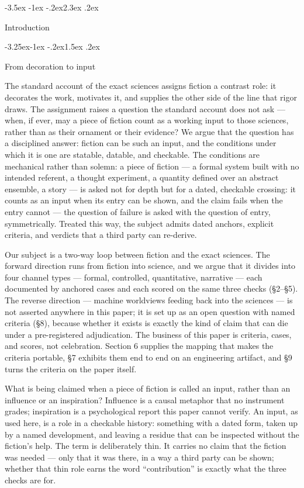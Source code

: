 \documentclass[11pt,a4paper]{article}
\makeatletter
\renewcommand\section{\@startsection{section}{1}{\z@}%
  {-3.5ex \@plus -1ex \@minus -.2ex}{2.3ex \@plus .2ex}%
  {\normalfont\Large\bfseries\raggedright}}
\renewcommand\subsection{\@startsection{subsection}{2}{\z@}%
  {-3.25ex\@plus -1ex \@minus -.2ex}{1.5ex \@plus .2ex}%
  {\normalfont\large\bfseries\raggedright}}
\makeatother
\begin{document}
\section{Introduction}

\subsection{From decoration to input}

The standard account of the exact sciences assigns fiction a contrast role: it decorates the work, motivates it, and supplies the other side of the line that rigor draws. The assignment raises a question the standard account does not ask — when, if ever, may a piece of fiction count as a working input to those sciences, rather than as their ornament or their evidence? We argue that the question has a disciplined answer: fiction can be such an input, and the conditions under which it is one are statable, datable, and checkable. The conditions are mechanical rather than solemn: a piece of fiction — a formal system built with no intended referent, a thought experiment, a quantity defined over an abstract ensemble, a story — is asked not for depth but for a dated, checkable crossing: it counts as an input when its entry can be shown, and the claim fails when the entry cannot — the question of failure is asked with the question of entry, symmetrically. Treated this way, the subject admits dated anchors, explicit criteria, and verdicts that a third party can re-derive.

Our subject is a two-way loop between fiction and the exact sciences. The forward direction runs from fiction into science, and we argue that it divides into four channel types — formal, controlled, quantitative, narrative — each documented by anchored cases and each scored on the same three checks (§2–§5). The reverse direction — machine worldviews feeding back into the sciences — is not asserted anywhere in this paper; it is set up as an open question with named criteria (§8), because whether it exists is exactly the kind of claim that can die under a pre-registered adjudication. The business of this paper is criteria, cases, and scores, not celebration. Section 6 supplies the mapping that makes the criteria portable, §7 exhibits them end to end on an engineering artifact, and §9 turns the criteria on the paper itself.

What is being claimed when a piece of fiction is called an input, rather than an influence or an inspiration? Influence is a causal metaphor that no instrument grades; inspiration is a psychological report this paper cannot verify. An input, as used here, is a role in a checkable history: something with a dated form, taken up by a named development, and leaving a residue that can be inspected without the fiction's help. The term is deliberately thin. It carries no claim that the fiction was needed --- only that it was there, in a way a third party can be shown; whether that thin role earns the word ``contribution'' is exactly what the three checks are for.
\end{document}
